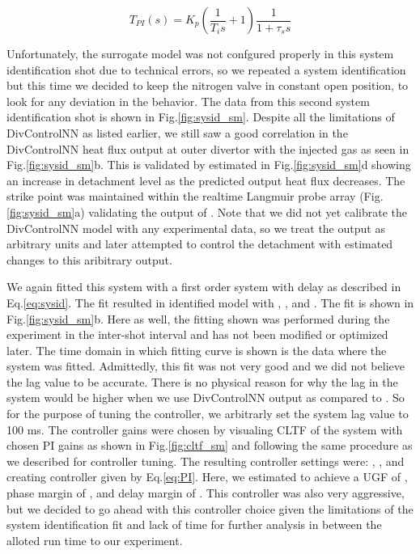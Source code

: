 \begin{equation}
    T_{PI}(s) = K_p \left( \frac{1}{T_i s} + 1\right) \frac{1}{1 + \tau_s s}
\label{eq:PI}
\end{equation}

Unfortunately, the surrogate model was not confgured properly in this system identification shot due to technical errors, so we repeated a system identification but this time we decided to keep the nitrogen valve in constant open position, to look for any deviation in the behavior.
The data from this second system identification shot is shown in Fig.\ref{fig:sysid_sm}.
Despite all the limitations of DivControlNN as listed earlier, we still saw a good correlation in the DivControlNN heat flux output at outer divertor with the injected gas as seen in Fig.\ref{fig:sysid_sm}b.
This is validated by estimated \Afrac in Fig.\ref{fig:sysid_sm}d showing an increase in detachment level as the predicted output heat flux decreases.
The strike point was maintained within the realtime Langmuir probe array (Fig.\ref{fig:sysid_sm}a) validating the output of \Afrac.
Note that we did not yet calibrate the DivControlNN model with any experimental data, so we treat the output as arbitrary units and later attempted to control the detachment with estimated changes to this aribitrary output.

We again fitted this system with a first order system with delay as described in Eq.\ref{eq:sysid}.
The fit resulted in identified model with \SMK, \SMTau, and \SML.
The fit is shown in Fig.\ref{fig:sysid_sm}b.
Here as well, the fitting shown was performed during the experiment in the inter-shot interval and has not been modified or optimized later.
The time domain in which fitting curve is shown is the data where the system was fitted.
Admittedly, this fit was not very good and we did not believe the lag value to be accurate.
There is no physical reason for why the lag in the system would be higher when we use DivControlNN output as compared to \Afrac.
So for the purpose of tuning the controller, we arbitrarly set the system lag value to 100 ms.
The controller gains were chosen by visualing \ac{CLTF} of the system with chosen PI gains as shown in Fig.\ref{fig:cltf_sm} and following the same procedure as we described for \Afrac controller tuning.
The resulting controller settings were: \SMKp, \SMTi, and \SMstau{} creating controller given by Eq.\ref{eq:PI}.
Here, we estimated to achieve a \ac{UGF} of \SMUGF, phase margin of \SMPhaseMargin, and delay margin of \SMDelayMargin.
This controller was also very aggressive, but we decided to go ahead with this controller choice given the limitations of the system identification fit and lack of time for further analysis in between the alloted run time to our experiment.
